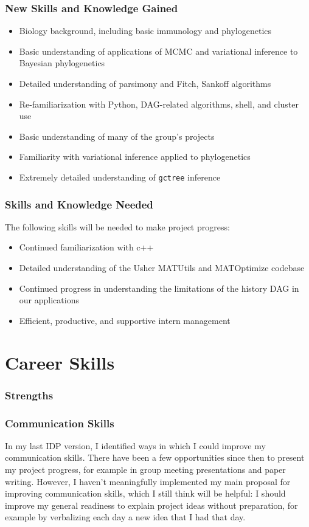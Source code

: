 \documentclass{paper}
\begin{document}
\subsubsection*{New Skills and Knowledge Gained}
\begin{itemize}
    \item Biology background, including basic immunology and phylogenetics
    \item Basic understanding of applications of MCMC and variational inference to Bayesian phylogenetics
    \item Detailed understanding of parsimony and Fitch, Sankoff algorithms
    \item Re-familiarization with Python, DAG-related algorithms, shell, and cluster use
    \item Basic understanding of many of the group's projects
    \item Familiarity with variational inference applied to phylogenetics
    \item Extremely detailed understanding of \texttt{gctree} inference
\end{itemize}
\subsubsection*{Skills and Knowledge Needed}
The following skills will be needed to make project progress:
\begin{itemize}
    \item Continued familiarization with c++
    \item Detailed understanding of the Usher MATUtils and MATOptimize codebase
    \item Continued progress in understanding the limitations of the history DAG in our applications
    \item Efficient, productive, and supportive intern management
\end{itemize}

\section*{Career Skills}

\subsubsection*{Strengths}

\subsubsection*{Communication Skills}
In my last IDP version, I identified ways in which I could improve my communication skills.
There have been a few opportunities since then to present my project progress, for example in group meeting presentations and paper writing.
However, I haven't meaningfully implemented my main proposal for improving communication skills, which I still think will be helpful:
I should improve my general readiness to explain project ideas without preparation, for example by verbalizing each day a new idea that I had that day.
\end{document}
